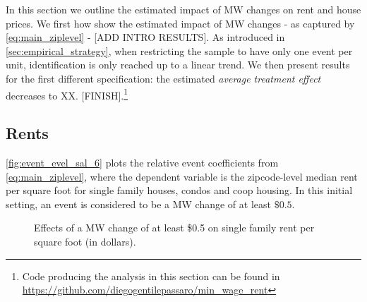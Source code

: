In this section we outline the estimated impact of MW changes on rent and house prices. We first how show the estimated impact of MW changes - as captured by \autoref{eq:main_ziplevel} - [ADD INTRO RESULTS]. As introduced in \autoref{sec:empirical_strategy}, when restricting the sample to have only one event per unit, identification is only reached up to a linear trend. We then present results for the first different specification: the estimated \textit{average treatment effect} decreases to XX. [FINISH].\footnote{Code producing the analysis in this section can be found in \url{https://github.com/diegogentilepassaro/min_wage_rent}} 

\subsection{Rents}

\autoref{fig:event_evel_sal_6} plots the relative event coefficients from \autoref{eq:main_ziplevel}, where the dependent variable is the zipcode-level median rent per square foot for single family houses, condos and coop housing. In this initial setting, an event is considered to be a MW change of at least $\$0.5$.  

\begin{figure}[h!]
    \centering
    \caption{Effects of a MW change of at least \$0.5 on single family rent per square foot (in dollars).}
    \label{fig:event_evel_sal_6}
\end{figure}

